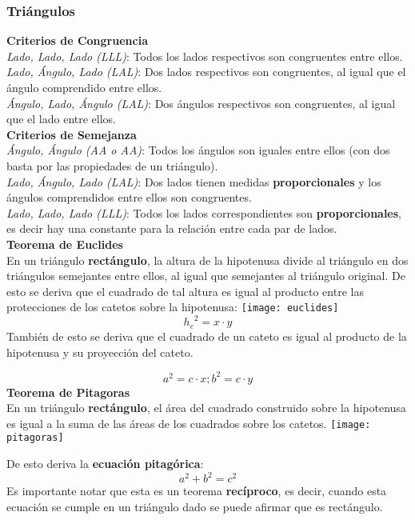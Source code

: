 \subsubsection{Triángulos}
\textbf{Criterios de Congruencia}\\
\textit{Lado, Lado, Lado (LLL)}: Todos los lados respectivos son congruentes entre ellos.\\
\textit{Lado, Ángulo, Lado (LAL)}: Dos lados respectivos son congruentes, al igual que el ángulo comprendido entre ellos.\\
\textit{Ángulo, Lado, Ángulo (LAL)}: Dos ángulos respectivos son congruentes, al igual que el lado entre ellos.\\

\textbf{Criterios de Semejanza}\\
\textit{Ángulo, Ángulo (AA o AA)}: Todos los ángulos son iguales entre ellos (con dos basta por las propiedades de un triángulo).\\
\textit{Lado, Ángulo, Lado (LAL)}: Dos lados tienen medidas \textbf{proporcionales} y los ángulos comprendidos entre ellos son congruentes.\\
\textit{Lado, Lado, Lado (LLL)}: Todos los lados correspondientes son \textbf{proporcionales}, es decir hay una constante para la relación entre cada par de lados.\\
\vfill\null\columnbreak
\textbf{Teorema de Euclides}\\
En un triángulo \textbf{rectángulo}, la altura de la hipotenusa divide al triángulo en dos triángulos semejantes entre ellos, al igual que semejantes al triángulo original. De esto se deriva que el cuadrado de tal altura es igual al producto entre las protecciones de los catetos sobre la hipotenusa:
\texttt{[image: euclides]}
\begin{equation*}
{h_c}^2 = x \cdot y
\end{equation*}
También de esto se deriva que el cuadrado de un cateto es igual al producto de la hipotenusa y su proyección del cateto.

\begin{equation*}
    a^2 = c \cdot x; b^2 = c \cdot y
\end{equation*}
\textbf{Teorema de Pitagoras}\\
En un triángulo \textbf{rectángulo}, el área del cuadrado construido sobre la hipotenusa es igual a la suma de las áreas de los cuadrados sobre los catetos.
\texttt{[image: pitagoras]}

De esto deriva la \textbf{ecuación pitagórica}:
\begin{equation*}
    a^2 + b^2 = c^2
\end{equation*}
Es importante notar que esta es un teorema \textbf{recíproco}, es decir, cuando esta ecuación se cumple en un triángulo dado se puede afirmar que es rectángulo.\\

